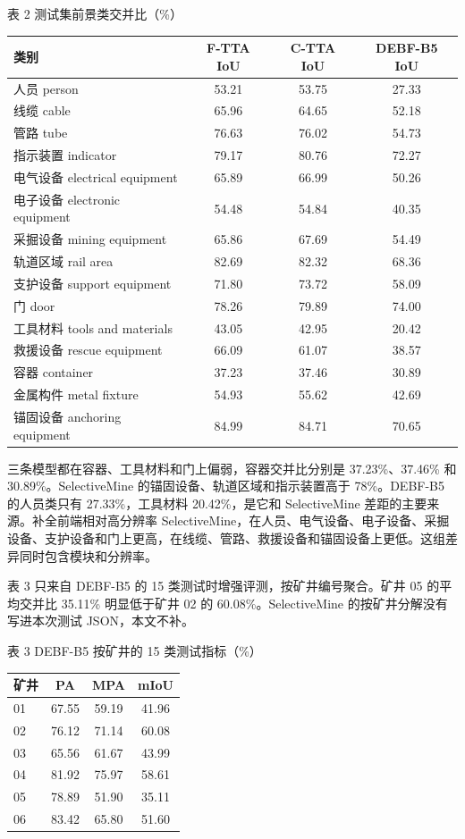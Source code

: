 \documentclass[11pt]{article}
\begin{document}
\begin{small}
表 2  测试集前景类交并比（\%）
\end{small}
{\small
\begin{longtable}{lccc}
\toprule
类别 & F-TTA IoU & C-TTA IoU & DEBF-B5 IoU \\
\midrule
\endhead
人员 person & 53.21 & 53.75 & 27.33 \\
线缆 cable & 65.96 & 64.65 & 52.18 \\
管路 tube & 76.63 & 76.02 & 54.73 \\
指示装置 indicator & 79.17 & 80.76 & 72.27 \\
电气设备 electrical equipment & 65.89 & 66.99 & 50.26 \\
电子设备 electronic equipment & 54.48 & 54.84 & 40.35 \\
采掘设备 mining equipment & 65.86 & 67.69 & 54.49 \\
轨道区域 rail area & 82.69 & 82.32 & 68.36 \\
支护设备 support equipment & 71.80 & 73.72 & 58.09 \\
门 door & 78.26 & 79.89 & 74.00 \\
工具材料 tools and materials & 43.05 & 42.95 & 20.42 \\
救援设备 rescue equipment & 66.09 & 61.07 & 38.57 \\
容器 container & 37.23 & 37.46 & 30.89 \\
金属构件 metal fixture & 54.93 & 55.62 & 42.69 \\
锚固设备 anchoring equipment & 84.99 & 84.71 & 70.65 \\
\bottomrule
\end{longtable}
}
三条模型都在容器、工具材料和门上偏弱，容器交并比分别是 37.23\%、37.46\% 和 30.89\%。SelectiveMine 的锚固设备、轨道区域和指示装置高于 78\%。DEBF-B5 的人员类只有 27.33\%，工具材料 20.42\%，是它和 SelectiveMine 差距的主要来源。补全前端相对高分辨率 SelectiveMine，在人员、电气设备、电子设备、采掘设备、支护设备和门上更高，在线缆、管路、救援设备和锚固设备上更低。这组差异同时包含模块和分辨率。

表 3 只来自 DEBF-B5 的 15 类测试时增强评测，按矿井编号聚合。矿井 05 的平均交并比 35.11\% 明显低于矿井 02 的 60.08\%。SelectiveMine 的按矿井分解没有写进本次测试 JSON，本文不补。

\begin{small}
表 3  DEBF-B5 按矿井的 15 类测试指标（\%）
\end{small}
{\small
\begin{longtable}{lccc}
\toprule
矿井 & PA & MPA & mIoU \\
\midrule
\endhead
01 & 67.55 & 59.19 & 41.96 \\
02 & 76.12 & 71.14 & 60.08 \\
03 & 65.56 & 61.67 & 43.99 \\
04 & 81.92 & 75.97 & 58.61 \\
05 & 78.89 & 51.90 & 35.11 \\
06 & 83.42 & 65.80 & 51.60 \\
\bottomrule
\end{longtable}
}
\end{document}
